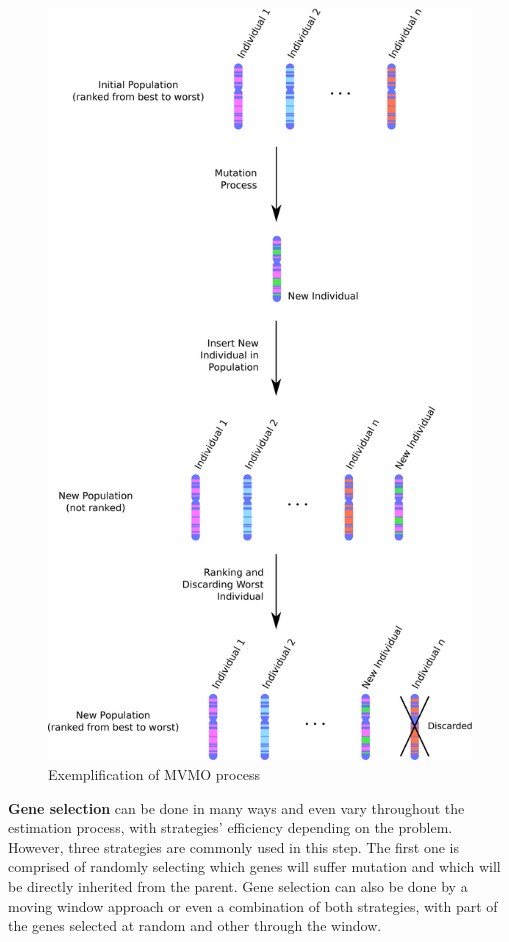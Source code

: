 \begin{figure}[h]
	\caption{Exemplification of MVMO process}
	\begin{center}
		\includegraphics[scale=.2]{Images/MVMO_process2.eps}
	\end{center}
	\label{fig: MVMOprocess}
\end{figure}

\textbf{Gene selection} can be done in many ways and even vary throughout the estimation process, with strategies' efficiency depending on the problem. However, three strategies are commonly used in this step. The first one is comprised of randomly selecting which genes will suffer mutation and which will be directly inherited from the parent. Gene selection can also be done by a moving window approach or even a combination of both strategies, with part of the genes selected at random and other through the window.

